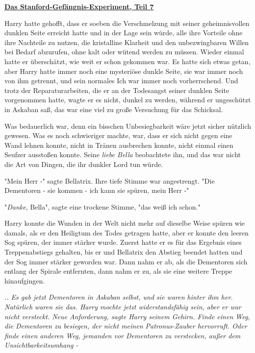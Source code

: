 

\hypertarget{das-stanford-gefuxe4ngnis-experiment-teil-7}{%

\textbf{\uline{Das Stanford-Gefängnis-Experiment, Teil 7}}

Harry hatte gehofft, dass er soeben die Verschmelzung mit seiner geheimnisvollen dunklen Seite erreicht hatte und in der Lage sein würde, alle ihre Vorteile ohne ihre Nachteile zu nutzen, die kristalline Klarheit und den unbezwingbaren Willen bei Bedarf abzurufen, ohne kalt oder wütend werden zu müssen. Wieder einmal hatte er überschätzt, wie weit er schon gekommen war. Es hatte sich etwas getan, aber Harry hatte immer noch eine mysteriöse dunkle Seite, sie war immer noch von ihm getrennt, und sein normales Ich war immer noch vorherrschend. Und trotz der Reparaturarbeiten, die er an der Todesangst seiner dunklen Seite vorgenommen hatte, wagte er es nicht, dunkel zu werden, während er ungeschützt in Askaban saß, das war eine viel zu große Versuchung für das Schicksal.

Was bedauerlich war, denn ein bisschen Unbesiegbarkeit wäre jetzt sicher nützlich gewesen. Was es noch schwieriger machte, war, dass er sich nicht gegen eine Wand lehnen konnte, nicht in Tränen ausbrechen konnte, nicht einmal einen Seufzer ausstoßen konnte. Seine \emph{liebe Bella} beobachtete ihn, und das war nicht die Art von Dingen, die ihr dunkler Lord tun würde.

"Mein Herr -" sagte Bellatrix. Ihre tiefe Stimme war angestrengt. "Die Dementoren - sie kommen - ich kann sie spüren, mein Herr -"

"\emph{Danke}, Bella", sagte eine trockene Stimme, "das weiß ich schon."

Harry konnte die Wunden in der Welt nicht mehr auf dieselbe Weise spüren wie damals, als er den Heiligtum des Todes getragen hatte, aber er konnte den leeren Sog spüren, der immer stärker wurde. Zuerst hatte er es für das Ergebnis eines Treppenabstiegs gehalten, bis er und Bellatrix den Abstieg beendet hatten und der Sog immer stärker geworden war. Dann nahm er ab, als die Dementoren sich entlang der Spirale entfernten, dann nahm er zu, als sie eine weitere Treppe hinaufgingen.

\emph{.. Es gab jetzt Dementoren in Askaban selbst, und sie waren hinter ihm her. Natürlich waren sie das. Harry mochte jetzt widerstandsfähig sein, aber er war nicht versteckt. Neue Anforderung, sagte Harry seinem Gehirn. Finde einen Weg, die Dementoren zu besiegen, der nicht meinen Patronus-Zauber hervorruft. Oder finde einen anderen Weg, jemanden vor Dementoren zu verstecken, außer dem Unsichtbarkeitsumhang -}

}
